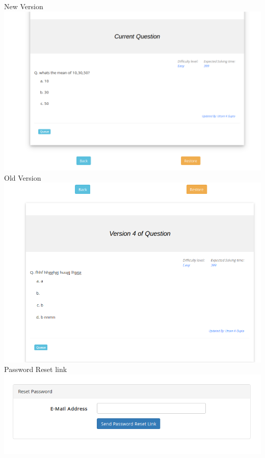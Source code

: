 \documentclass[a4paper,12pt,oneside]{book}
\begin{document}
\newpage \vspace{2in}
New Version \\
\includegraphics[scale=0.4]{version1.png}	\\

Old Version\\
\includegraphics[scale=0.4]{version3.png}	\\

\vspace{2in}
Password Reset link \\
\includegraphics[scale=0.4]{password.png}	\\
\end{document}
